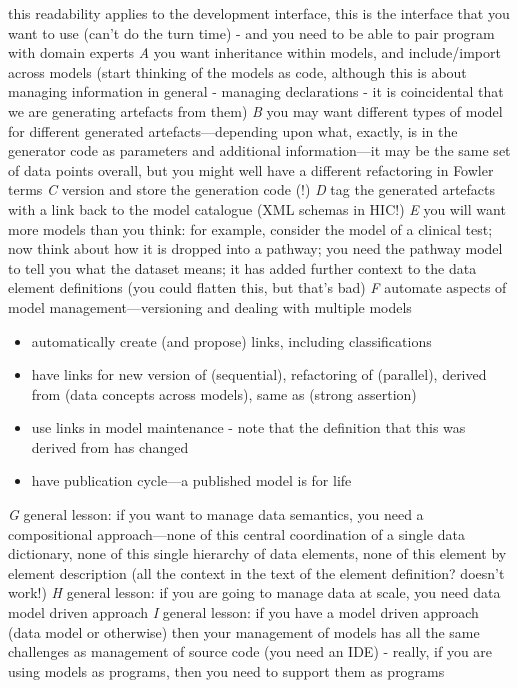  this readability applies to the development interface, this is
  the interface that you want to use (can't do the turn time) - and
  you need to be able to pair program with domain experts
\textsl{A} you want inheritance within models, and include/import across
  models (start thinking of the models as code, although this is about
  managing information in general - managing declarations - it is
  coincidental that we are generating artefacts from them)
\textsl{B} you may want different types of model for different generated
  artefacts---depending upon what, exactly, is in the generator code
  as parameters and additional information---it may be the same set of
  data points overall, but you might well have a different refactoring
  in Fowler terms
\textsl{C} version and store the generation code (!)
\textsl{D} tag the generated artefacts with a link back to the model
  catalogue (XML schemas in HIC!)
\textsl{E} you will want more models than you think: for example, consider
  the model of a clinical test; now think about how it is dropped into
  a pathway; you need the pathway model to tell you what the dataset
  means; it has added further context to the data element definitions
  (you could flatten this, but that's bad)
\textsl{F} automate aspects of model management---versioning and dealing
  with multiple models
  \begin{itemize}
  \item automatically create (and propose) links, including
    classifications
  \item have links for new version of (sequential), refactoring of
    (parallel), derived from (data concepts across models), same as
    (strong assertion)
  \item use links in model maintenance - note that the definition that
    this was derived from has changed
  \item have publication cycle---a published model is for life
  \end{itemize}
\textsl{G} general lesson: if you want to manage data semantics, you need a
  compositional approach---none of this central coordination of a
  single data dictionary, none of this single hierarchy of data
  elements, none of this element by element description (all the
  context in the text of the element definition?  doesn't work!)
\textsl{H} general lesson: if you are going to manage data at scale, you
  need data model driven approach
\textsl{I} general lesson: if you have a model driven approach (data model
  or otherwise) then your management of models has all the same
  challenges as management of source code (you need an IDE) - really,
  if you are using models as programs, then you need to support them
  as programs

